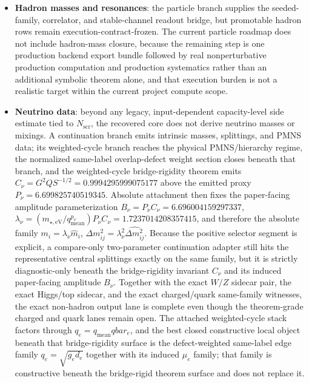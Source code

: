 \begin{itemize}
absolute family and splittings on that branch. The exact positive-segment adapter, the bridge corridor, and the reduced-correction audit remain diagnostic-only beneath this bridge-rigidity surface. The \(\varepsilon = 1/6\) texture language is the extra uniform-center-label collapse of this richer dictionary and is not a recovered-core theorem.
\item \textbf{Hadron masses and resonances}: the particle branch supplies the seeded-family, correlator, and stable-channel readout bridge, but promotable hadron rows remain execution-contract-frozen. The current particle roadmap does not include hadron-mass closure, because the remaining step is one production backend export bundle followed by real nonperturbative production computation and production systematics rather than an additional symbolic theorem alone, and that execution burden is not a realistic target within the current project compute scope.
\item \textbf{Neutrino data}: beyond any legacy, input-dependent capacity-level side estimate tied to $N_{\mathrm{scr}}$, the recovered core does not derive neutrino masses or mixings. A continuation branch emits intrinsic masses, splittings, and PMNS data; its weighted-cycle branch reaches the physical PMNS/hierarchy regime, the normalized same-label overlap-defect weight section closes beneath that branch, and the weighted-cycle bridge-rigidity theorem emits \(C_\nu=G^2Q S^{-1/2}=0.9994295999075177\) above the emitted proxy \(P_\nu=6.699825740519345\). Absolute attachment then fixes the paper-facing amplitude parameterization \(B_\nu=P_\nu C_\nu=6.696004159297337\), \(\lambda_\nu=(m_{\star,\mathrm{eV}}/q_{\mathrm{mean}}^{p_\nu})P_\nu C_\nu=1.7237014208357415\), and therefore the absolute family \(m_i=\lambda_\nu\hat m_i\), \(\Delta m_{ij}^2=\lambda_\nu^2\widehat{\Delta m_{ij}^2}\). Because the positive selector segment is explicit, a compare-only two-parameter continuation adapter still hits the representative central splittings exactly on the same family, but it is strictly diagnostic-only beneath the bridge-rigidity invariant \(C_\nu\) and its induced paper-facing amplitude \(B_\nu\). Together with the exact \(W/Z\) sidecar pair, the exact Higgs/top sidecar, and the exact charged/quark same-family witnesses, the exact non-hadron output lane is complete even though the theorem-grade charged and quark lanes remain open. The attached weighted-cycle stack factors through \(q_e = q_{\mathrm{mean}} qbar_e\), and the best closed constructive local object beneath that bridge-rigidity surface is the defect-weighted same-label edge family \(q_e=\sqrt{g_e d_e}\) together with its induced \(\mu_e\) family; that family is constructive beneath the bridge-rigid theorem surface and does not replace it.

\end{itemize}
